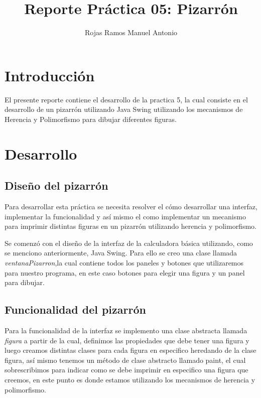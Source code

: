 \documentclass[]{article}
\title{Reporte Práctica 05: Pizarrón}
\author{Rojas Ramos Manuel Antonio}
\begin{document}
	
	\maketitle
	
	\section{Introducción}
	
	El presente reporte contiene el desarrollo de la practica 5, la cual consiste en el desarrollo de un pizarrón utilizando Java Swing utilizando los mecanismos de Herencia y Polimorfismo para dibujar diferentes figuras.
	
	\section{Desarrollo}
	
	\subsection{Diseño del pizarrón}
	
	Para desarrollar esta práctica se necesita resolver el cómo desarrollar una interfaz, implementar la funcionalidad y así mismo el como implementar un mecanismo para imprimir distintas figuras en un pizarrón utilizando herencia y polimorfismo.
	
	Se comenzó con el diseño de la interfaz de la calculadora básica utilizando, como se menciono anteriormente, Java Swing. Para ello se creo una clase llamada \textit{ventanaPizarron},la cual contiene todos los paneles y botones que utilizaremos para nuestro programa, en este caso botones para elegir una figura y un panel para dibujar.
	
	\subsection{Funcionalidad del pizarrón}
	
	Para la funcionalidad de la interfaz se implemento una clase abstracta llamada \textit{figura} a partir de la cual, definimos las propiedades que debe tener una figura y luego creamos distintas clases para cada figura en especifico heredando de la clase figura, así mismo tenemos un método de clase abstracto llamado paint, el cual sobrescribimos para indicar como se debe imprimir en especifico una figura que creemos, en este punto es donde estamos utilizando los mecanismos de herencia y polimorfismo.
	
\end{document}
